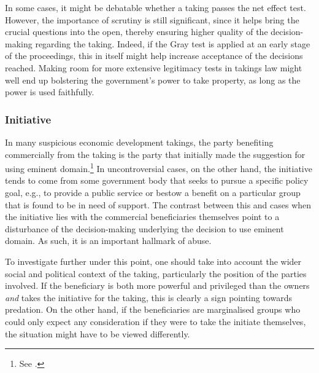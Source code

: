 In some cases, it might be debatable whether a taking passes the net effect test. However, the importance of scrutiny is still significant, since it helps bring the crucial questions into the open, thereby ensuring higher quality of the decision-making regarding the taking. Indeed, if the Gray test is applied at an early stage of the proceedings, this in itself might help increase acceptance of the decisions reached. Making room for more extensive legitimacy tests in takings law might well end up bolstering the government's power to take property, as long as the power is used faithfully.

\subsubsection*{Initiative}

In many suspicious economic development takings, the party benefiting commercially from the taking is the party that initially made the suggestion for using eminent domain.\footnote{See \cite[32]{gray11}.} In uncontroversial cases, on the other hand, the initiative tends to come from some government body that seeks to pursue a specific policy goal, e.g., to provide a public service or bestow a benefit on a particular group that is found to be in need of support. The contrast between this and cases when the initiative lies with the commercial beneficiaries themselves point to a disturbance of the decision-making underlying the decision to use eminent domain. As such, it is an important hallmark of abuse.

To investigate further under this point, one should take into account the wider social and political context of the taking, particularly the position of the parties involved. If the beneficiary is both more powerful and privileged than the owners {\it and} takes the initiative for the taking, this is clearly a sign pointing towards predation. On the other hand, if the beneficiaries are marginalised groups who could only expect any consideration if they were to take the initiate themselves, the situation might have to be viewed differently. %

